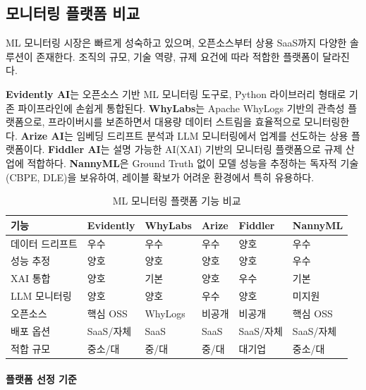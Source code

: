 \subsection{모니터링 플랫폼 비교}
\label{sec:14.3.2}

ML 모니터링 시장은 빠르게 성숙하고 있으며, 오픈소스부터 상용 SaaS까지 다양한 솔루션이 존재한다. 조직의 규모, 기술 역량, 규제 요건에 따라 적합한 플랫폼이 달라진다.

\textbf{Evidently AI}는 오픈소스 기반 ML 모니터링 도구로, Python 라이브러리 형태로 기존 파이프라인에 손쉽게 통합된다. \textbf{WhyLabs}는 Apache WhyLogs 기반의 관측성 플랫폼으로, 프라이버시를 보존하면서 대용량 데이터 스트림을 효율적으로 모니터링한다. \textbf{Arize AI}는 임베딩 드리프트 분석과 LLM 모니터링에서 업계를 선도하는 상용 플랫폼이다. \textbf{Fiddler AI}는 설명 가능한 AI(XAI) 기반의 모니터링 플랫폼으로 규제 산업에 적합하다. \textbf{NannyML}은 Ground Truth 없이 모델 성능을 추정하는 독자적 기술(CBPE, DLE)을 보유하여, 레이블 확보가 어려운 환경에서 특히 유용하다.

\begin{table}[htbp]
\centering
\caption{ML 모니터링 플랫폼 기능 비교}
\label{tab:14_monitoring_platform}
\begin{tabularx}{\textwidth}{p{2.2cm}p{1.5cm}p{1.5cm}p{1.5cm}p{1.5cm}p{1.5cm}}
\toprule
\textbf{기능} & \textbf{Evidently} & \textbf{WhyLabs} & \textbf{Arize} & \textbf{Fiddler} & \textbf{NannyML} \\
\midrule
데이터 드리프트 & 우수 & 우수 & 우수 & 양호 & 우수 \\
성능 추정 & 양호 & 양호 & 양호 & 양호 & 우수 \\
XAI 통합 & 양호 & 기본 & 양호 & 우수 & 기본 \\
LLM 모니터링 & 양호 & 양호 & 우수 & 양호 & 미지원 \\
오픈소스 & 핵심 OSS & WhyLogs & 비공개 & 비공개 & 핵심 OSS \\
배포 옵션 & SaaS/자체 & SaaS & SaaS & SaaS/자체 & SaaS/자체 \\
적합 규모 & 중소/대 & 중/대 & 중/대 & 대기업 & 중소/대 \\
\bottomrule
\end{tabularx}
\end{table}

\paragraph{플랫폼 선정 기준}

